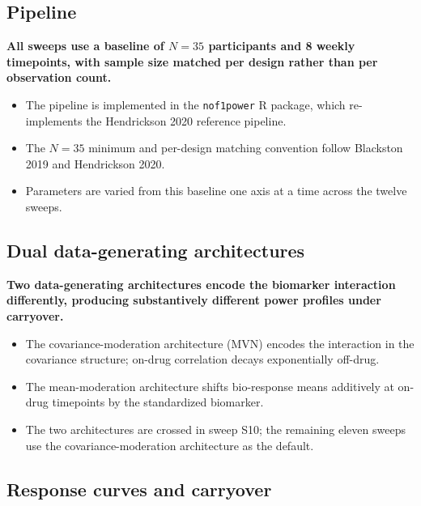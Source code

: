 \documentclass[
  11pt,
]{article}
\begin{document}
\subsection{Pipeline}\label{pipeline}

\textbf{All sweeps use a baseline of $N = 35$ participants and 8 weekly timepoints, with sample size matched per design rather than per observation count.}

\begin{itemize}\setlength{\itemsep}{2pt}\setlength{\parskip}{0pt}
\item The pipeline is implemented in the \texttt{nof1power} R package, which re-implements the Hendrickson 2020 reference pipeline.
\item The $N = 35$ minimum and per-design matching convention follow Blackston 2019 and Hendrickson 2020.
\item Parameters are varied from this baseline one axis at a time across the twelve sweeps.
\end{itemize}

\subsection{Dual data-generating architectures}\label{dual-data-generating-architectures}

\textbf{Two data-generating architectures encode the biomarker interaction differently, producing substantively different power profiles under carryover.}

\begin{itemize}\setlength{\itemsep}{2pt}\setlength{\parskip}{0pt}
\item The covariance-moderation architecture (MVN) encodes the interaction in the covariance structure; on-drug correlation decays exponentially off-drug.
\item The mean-moderation architecture shifts bio-response means additively at on-drug timepoints by the standardized biomarker.
\item The two architectures are crossed in sweep S10; the remaining eleven sweeps use the covariance-moderation architecture as the default.
\end{itemize}

\subsection{Response curves and carryover}\label{response-curves-and-carryover}
\end{document}
